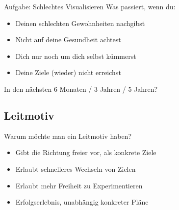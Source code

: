 \begin{frame}[c]
    \begin{block}{Aufgabe: Schlechtes Visualisieren}
    Was passiert, wenn du:
    \begin{itemize}
        \item Deinen schlechten Gewohnheiten nachgibst
        \item Nicht auf deine Gesundheit achtest
        \item Dich nur noch um dich selbst kümmerst
        \item Deine Ziele (wieder) nicht erreichst
    \end{itemize}
    \pause
    In den nächsten 6 Monaten / 3 Jahren / 5 Jahren?
    \end{block}
\end{frame}






\subsection{Leitmotiv}

\begin{frame}[c]{Warum möchte man ein Leitmotiv haben?}
    \large
    \begin{itemize}[<+(1)->]
        \item Gibt die Richtung freier vor, als konkrete Ziele
        \item Erlaubt schnelleres Wechseln von Zielen
        \item Erlaubt mehr Freiheit zu Experimentieren
        \item Erfolgserlebnis, unabhängig konkreter Pläne
    \end{itemize}
\end{frame}


